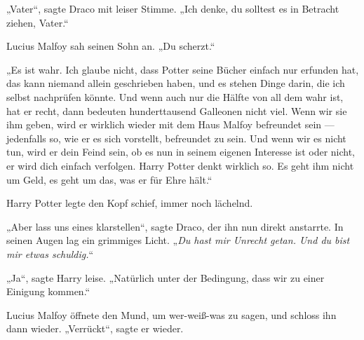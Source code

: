 „Vater“, sagte Draco mit leiser Stimme.
„Ich denke, du solltest es in Betracht ziehen, Vater.“

Lucius Malfoy sah seinen Sohn an.
„Du scherzt.“

„Es ist wahr. Ich glaube nicht, dass Potter seine Bücher einfach nur erfunden hat, das kann niemand allein geschrieben haben, und es stehen Dinge darin, die ich selbst nachprüfen könnte. Und wenn auch nur die Hälfte von all dem wahr ist, hat er recht, dann bedeuten hunderttausend Galleonen nicht viel. Wenn wir sie ihm geben, wird er wirklich wieder mit dem Haus Malfoy befreundet sein — jedenfalls so, wie er es sich vorstellt, befreundet zu sein. Und wenn wir es nicht tun, wird er dein Feind sein, ob es nun in seinem eigenen Interesse ist oder nicht, er wird dich einfach verfolgen. Harry Potter denkt wirklich so. Es geht ihm nicht um Geld, es geht um das, was er für Ehre hält.“

Harry Potter legte den Kopf schief, immer noch lächelnd.

„Aber lass uns eines klarstellen“, sagte Draco, der ihn nun direkt anstarrte. In seinen Augen lag ein grimmiges Licht.
„\emph{Du hast mir Unrecht getan. \emph{Und} du bist mir etwas schuldig.}“

„Ja“, sagte Harry leise.
„Natürlich unter der Bedingung, dass wir zu einer Einigung kommen.“

Lucius Malfoy öffnete den Mund, um wer-weiß-was zu sagen, und schloss ihn dann wieder.
„Verrückt“, sagte er wieder.

